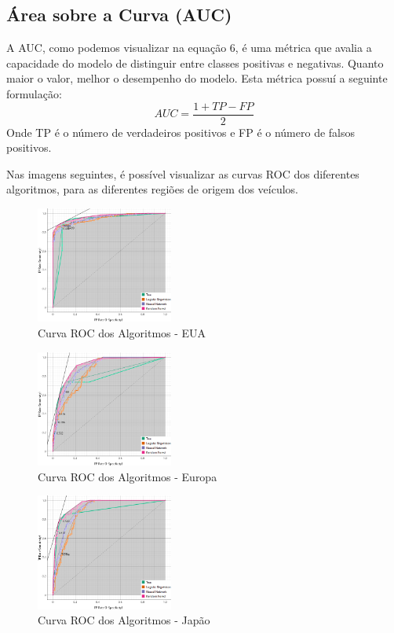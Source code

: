 \documentclass[conference]{IEEEtran}
\begin{document}
\subsection{Área sobre a Curva (AUC)}
A AUC, como podemos visualizar na equação 6, é uma métrica que avalia a capacidade do modelo de distinguir entre classes positivas e negativas. Quanto maior o valor, melhor o desempenho do modelo.
Esta métrica possuí a seguinte formulação:
\begin{equation}
	AUC = \frac{1 + TP - FP}{2}
\end{equation}
Onde TP é o número de verdadeiros positivos e FP é o número de falsos positivos.

Nas imagens seguintes, é possível visualizar as curvas ROC dos diferentes algoritmos, para as diferentes regiões de origem dos veículos.

\begin{figure}[!ht]
	\centering
	\includegraphics[width=0.4\textwidth]{Resources/ROC_EUA.png}
	\caption{Curva ROC dos Algoritmos - EUA}
\end{figure}

\begin{figure}[!ht]
	\centering
	\includegraphics[width=0.4\textwidth]{Resources/ROC_EU.png}
	\caption{Curva ROC dos Algoritmos - Europa}
\end{figure}

\begin{figure}[!ht]
	\centering
	\includegraphics[width=0.4\textwidth]{Resources/ROC_JP.png}
	\caption{Curva ROC dos Algoritmos - Japão}
\end{figure}
\newpage
\end{document}
